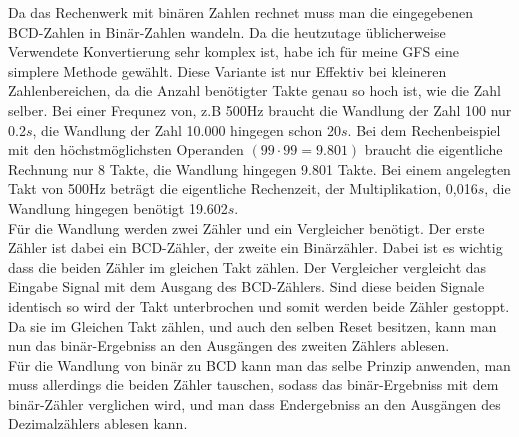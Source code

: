 \documentclass[a4paper,12pt,fleqn,oneside]{article}
\begin{document}
	\noindent	
	Da das Rechenwerk mit binären Zahlen rechnet muss man die eingegebenen BCD-Zahlen in Binär-Zahlen wandeln. Da 
	die heutzutage üblicherweise Verwendete Konvertierung sehr komplex ist, habe ich für meine GFS eine simplere 
	Methode gewählt. Diese Variante ist nur Effektiv bei kleineren Zahlenbereichen, da die Anzahl benötigter Takte 
	genau so hoch ist, wie die Zahl selber. Bei einer Frequnez von, z.B 500Hz braucht die Wandlung der Zahl 100 nur 
	0.2$s$, die Wandlung der Zahl 10.000 hingegen schon 20$s$. Bei dem Rechenbeispiel mit den höchstmöglichsten 
	Operanden $(99 \cdot 99 = 9.801)$ braucht die eigentliche Rechnung nur 8 Takte, die Wandlung hingegen 9.801 
	Takte. Bei einem angelegten Takt von 500Hz beträgt die eigentliche Rechenzeit, der Multiplikation, 0,016$s$, die Wandlung 
	hingegen benötigt 19.602$s$.\\
	Für die Wandlung werden zwei Zähler und ein Vergleicher benötigt. Der erste Zähler ist dabei ein BCD-Zähler, der
	zweite ein Binärzähler. Dabei ist es wichtig dass die beiden Zähler im gleichen Takt zählen. Der Vergleicher 
	vergleicht das Eingabe Signal mit dem Ausgang des BCD-Zählers. Sind diese beiden Signale identisch so wird der
	Takt unterbrochen und somit werden beide Zähler gestoppt. Da sie im Gleichen Takt zählen, und auch den selben 
	Reset besitzen, kann man nun das binär-Ergebniss an den Ausgängen des zweiten Zählers ablesen.\\
	Für die Wandlung von binär zu BCD kann man das selbe Prinzip anwenden, man muss allerdings die beiden Zähler
	tauschen, sodass das binär-Ergebniss mit dem binär-Zähler verglichen wird, und man dass Endergebniss an den 
	Ausgängen des Dezimalzählers ablesen kann.


\newpage
\end{document}
